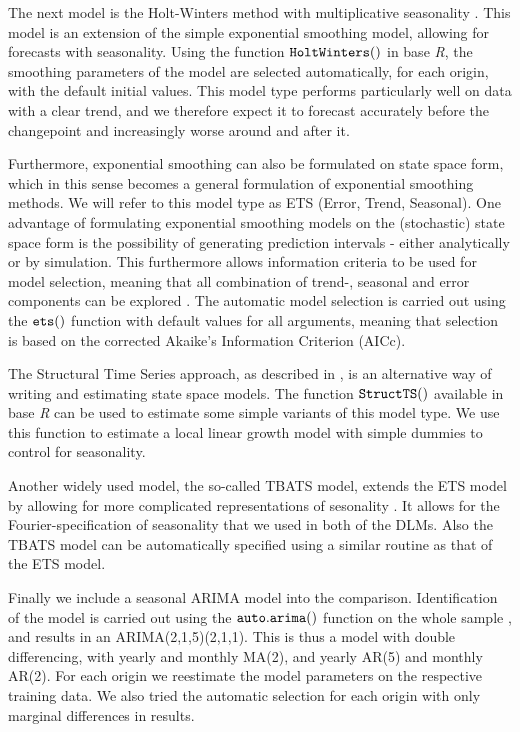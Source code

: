 \documentclass[12pt, a4paper]{article}
\begin{document}
The next model is the Holt-Winters method with
multiplicative seasonality
\citep{holt2004forecasting, winters1960forecasting}. This model is an
extension of the simple exponential smoothing model, allowing for
forecasts with seasonality. Using the function ${\tt HoltWinters()}$ in
base \emph{R}, the smoothing parameters of the model are selected
automatically, for each origin, with the default initial values. This
model type performs particularly well on data with a clear trend, and we
therefore expect it to forecast accurately before the changepoint and
increasingly worse around and after it.

Furthermore, exponential smoothing can also be formulated on state space
form, which in this sense becomes a general formulation of exponential smoothing
methods. We will refer to this model type as ETS (Error, Trend,
Seasonal). One advantage of formulating exponential smoothing models on the
(stochastic) state space form is the possibility of generating prediction
intervals - either analytically or by simulation. This furthermore
allows information criteria to be used for model selection, meaning that
all combination of trend-, seasonal and error components can be explored
\citep{hyndman2002state}. The automatic model selection is carried out
using the ${\tt ets()}$ function with default values for all
arguments, meaning that selection is based on the corrected Akaike's
Information Criterion (AICc).

The Structural Time Series approach, as described in \citet{harvey1990forecasting}, is an alternative way of writing and estimating state space models. The function ${\tt StructTS()}$ available in base \textit{R} can be used to estimate some simple variants of this model type. We use this function to estimate a local linear growth model with simple dummies to control for seasonality.

Another widely used model, the so-called TBATS model, extends the ETS model by allowing for more complicated representations of sesonality \citep{de2011forecasting}. It allows for the Fourier-specification of seasonality that we used in both of the DLMs. Also the TBATS model can be automatically specified using a similar routine as that of the ETS model.

Finally we include a seasonal ARIMA model into the comparison.
Identification of the model is carried out using the
${\tt auto.arima()}$ function on the whole sample \citep{hyndman2019},
and results in an ARIMA(2,1,5)(2,1,1). This is thus a model with double
differencing, with yearly and monthly MA(2), and yearly AR(5) and
monthly AR(2). For each origin we reestimate the model parameters on the
respective training data. We also tried the automatic selection for each
origin with only marginal differences in results.
\end{document}
